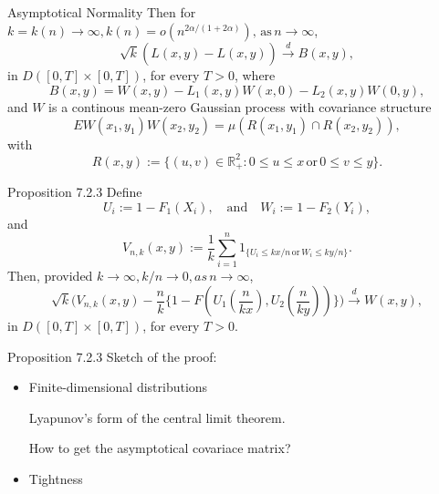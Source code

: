 \documentclass[11pt]{beamer}
\begin{document}
\begin{frame}{Asymptotical Normality}
Then for $k=k(n)\to \infty, k(n)=o(n^{2\alpha/(1+2\alpha)}), \, \text{as} \, n\to \infty$,
\begin{displaymath}
\sqrt{k}(\hat{L}(x,y)-L(x,y))\stackrel{d}{\to } B(x,y),
\end{displaymath}
in $D([0,T]\times [0,T])$, for every $T>0$, where
\begin{displaymath}
B(x,y)=W(x,y) -L_1(x,y)W(x,0)-L_2(x,y) W(0,y),
\end{displaymath}
and $W$ is a continous mean-zero Gaussian process with covariance structure
\begin{displaymath}
EW(x_1,y_1)W(x_2,y_2)=\mu(R(x_1,y_1)\cap R(x_2,y_2)),
\end{displaymath}
with 
\begin{displaymath}
R(x,y):=\{ (u,v) \in \mathbb{R}_{+}^2:0\le u\le x \, \text{or} \, 0\le v\le y\}.
\end{displaymath}
\end{frame}
\begin{frame}{Proposition 7.2.3}
Define
\begin{displaymath}
U_i:=1-F_1(X_i), \quad \text{and} \quad W_i:=1-F_2(Y_i),
\end{displaymath}
and
\begin{displaymath}
V_{n,k}(x,y):=\frac{1}{k} \sum_{i=1}^n 1_{\{ U_i\le kx/n \, \text{or} \, W_i \le ky/n\}}.
\end{displaymath}
Then, provided $k\to \infty, k/n \to 0, as\, n \to \infty$,
\begin{displaymath}
\sqrt{k}\big(V_{n,k}(x,y)-\dfrac{n}{k}\{ 1-F(U_1(\dfrac{n}{kx}), U_2(\dfrac{n}{ky})) \} \big)\stackrel{d}{\to} W(x,y),
\end{displaymath}
in $D([0,T]\times[0,T])$, for every $T>0$.                                                                                                                                                                                                    
\end{frame}
\begin{frame}{Proposition 7.2.3}
Sketch of the proof:
\begin{itemize}
\item Finite-dimensional distributions\par 
\quad Lyapunov's form of the central limit theorem.\par 
\quad How to get the asymptotical covariace matrix?
\item Tightness                                                               
\end{itemize}
\end{frame}
\end{document}
